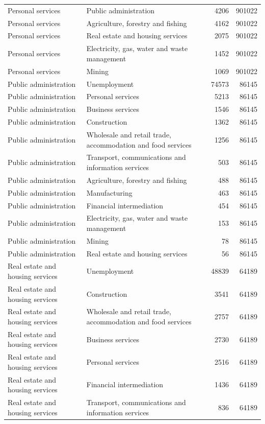 \begin{longtable}{llrr}
Personal services & Public administration & 4206 & 901022 \\
Personal services & Agriculture, forestry and fishing & 4162 & 901022 \\
Personal services & Real estate and housing services & 2075 & 901022 \\
Personal services & Electricity, gas, water and waste management & 1452 & 901022 \\
Personal services & Mining & 1069 & 901022 \\
Public administration & Unemployment & 74573 & 86145 \\
Public administration & Personal services & 5213 & 86145 \\
Public administration & Business services & 1546 & 86145 \\
Public administration & Construction & 1362 & 86145 \\
Public administration & Wholesale and retail trade, accommodation and food services & 1256 & 86145 \\
Public administration & Transport, communications and information services & 503 & 86145 \\
Public administration & Agriculture, forestry and fishing & 488 & 86145 \\
Public administration & Manufacturing & 463 & 86145 \\
Public administration & Financial intermediation & 454 & 86145 \\
Public administration & Electricity, gas, water and waste management & 153 & 86145 \\
Public administration & Mining & 78 & 86145 \\
Public administration & Real estate and housing services & 56 & 86145 \\
Real estate and housing services & Unemployment & 48839 & 64189 \\
Real estate and housing services & Construction & 3541 & 64189 \\
Real estate and housing services & Wholesale and retail trade, accommodation and food services & 2757 & 64189 \\
Real estate and housing services & Business services & 2730 & 64189 \\
Real estate and housing services & Personal services & 2516 & 64189 \\
Real estate and housing services & Financial intermediation & 1436 & 64189 \\
Real estate and housing services & Transport, communications and information services & 836 & 64189 \\

\end{longtable}
